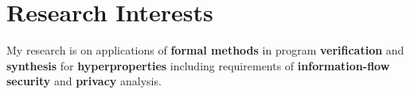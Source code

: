 

\section{Research Interests}

My research is on applications of {\bf formal methods} in program {\bf verification} and {\bf synthesis} for {\bf hyperproperties} including requirements of {\bf information-flow security} and {\bf privacy} analysis.\\

